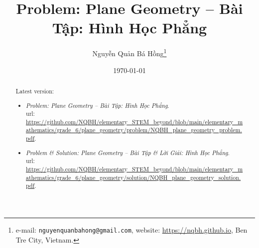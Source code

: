 \documentclass{article}
\title{Problem: Plane Geometry -- Bài Tập: Hình Học Phẳng}
\author{Nguyễn Quản Bá Hồng\footnote{e-mail: \texttt{nguyenquanbahong@gmail.com}, website: \url{https://nqbh.github.io}, Ben Tre City, Vietnam.}}
\date{\today}
\begin{document}
\maketitle
\begin{abstract}
	Latest version:
	\begin{itemize}
		\item \textit{Problem: Plane Geometry -- Bài Tập: Hình Học Phẳng}.\\{\sc url}: \url{https://github.com/NQBH/elementary_STEM_beyond/blob/main/elementary_mathematics/grade_6/plane_geometry/problem/NQBH_plane_geometry_problem.pdf}.
		\item \textit{Problem \& Solution: Plane Geometry -- Bài Tập \& Lời Giải: Hình Học Phẳng}.\\{\sc url}: \url{https://github.com/NQBH/elementary_STEM_beyond/blob/main/elementary_mathematics/grade_6/plane_geometry/solution/NQBH_plane_geometry_solution.pdf}.
	\end{itemize}
\end{abstract}
\tableofcontents


\end{document}
